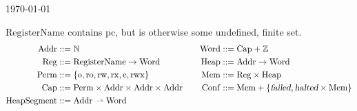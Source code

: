 \documentclass{article}
\newcommand{\parfun}{\rightharpoonup}
\newcommand{\pcreg}{\mathrm{pc}}
\newcommand{\failed}{\textsl{failed}}
\newcommand{\halted}{\textsl{halted}}
\newcommand{\plaindom}[1]{\mathrm{#1}}
\newcommand{\Caps}{\plaindom{Cap}}
\newcommand{\Words}{\plaindom{Word}}
\newcommand{\Addrs}{\plaindom{Addr}}
\newcommand{\Mems}{\plaindom{Mem}}
\newcommand{\RegName}{\plaindom{RegisterName}}
\newcommand{\Regs}{\plaindom{Reg}}
\newcommand{\Heaps}{\plaindom{Heap}}
\newcommand{\HeapSegments}{\plaindom{HeapSegment}}
\newcommand{\Confs}{\plaindom{Conf}}
\newcommand{\nats}{\mathbb{N}}
\newcommand{\ints}{\mathbb{Z}}
\newcommand{\Perms}{\plaindom{Perm}}
\newcommand{\plainperm}[1]{\mathrm{#1}}
\newcommand{\noperm}{\plainperm{o}}
\newcommand{\readonly}{\plainperm{ro}}
\newcommand{\readwrite}{\plainperm{rw}}
\newcommand{\exec}{\plainperm{rx}}
\newcommand{\entry}{\plainperm{e}}
\newcommand{\rwx}{\plainperm{rwx}}
\begin{document}
\begin{flushright}
\today
\end{flushright}
$\RegName$ contains $\pcreg$, but is otherwise some undefined, finite set.
\begin{align*}
\Addrs &::= \nats & & &
\Words &::= \Caps + \ints \\
\Regs  &::= \RegName \rightarrow \Words & & &
\Heaps &::= \Addrs \rightarrow \Words \\
\Perms &::= \{ \noperm, \readonly, \readwrite, \exec, \entry, \rwx\} & & &
\Mems  &::= \Regs \times \Heaps \\
\Caps  &::= \Perms \times \Addrs \times \Addrs \times \Addrs & & &
\Confs &::= \Mems + \{\failed, \halted \times \Mems\} \\
\HeapSegments &::= \Addrs \parfun \Words & & & &
\end{align*}
\end{document}
